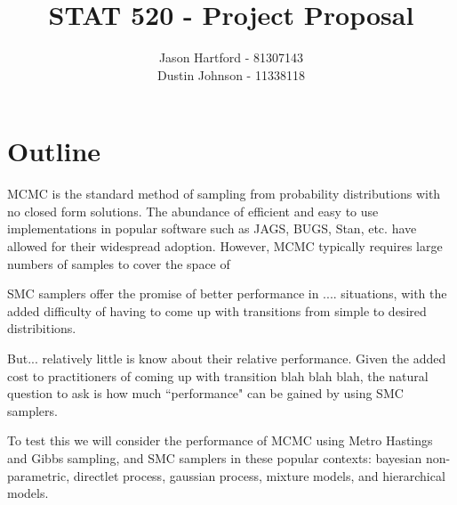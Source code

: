 \documentclass[11pt, oneside]{amsart}
\title{STAT 520 - Project Proposal}
\author{Jason Hartford - 81307143 \\
Dustin Johnson - 11338118}
\begin{document}
\maketitle


\section{Outline}
MCMC is the standard method of sampling from probability distributions with no closed form solutions. The abundance of efficient and easy to use implementations in popular software such as JAGS, BUGS, Stan, etc. have allowed for their widespread adoption. However, MCMC typically requires large numbers of samples to cover the space of  

SMC samplers offer the promise of better performance in .... situations, with the added difficulty of having to come up with transitions from simple to desired distribitions.

But... relatively little is know about their relative performance. Given the added cost to practitioners of coming up with transition blah blah blah, the natural question to ask is how much ``performance" can be gained by using SMC samplers.

To test this we will consider the performance of MCMC using Metro Hastings and Gibbs sampling, and SMC samplers in these popular contexts: bayesian non-parametric, directlet process, gaussian process, mixture models, and hierarchical models.

% 
\end{document}

